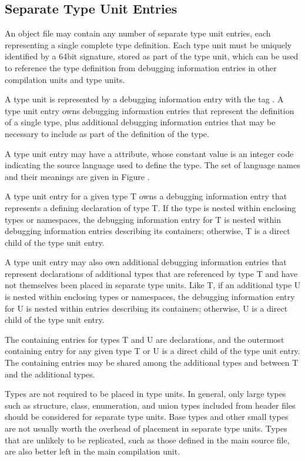 \subsection{Separate Type Unit Entries}
\label{chap:separatetypeunitentries}
An object file may contain any number of separate type
unit entries, each representing a single complete type
definition. Each type unit must be uniquely identified by
a 64\dash bit signature, stored as part of the type unit, which
can be used to reference the type definition from debugging
information entries in other compilation units and type units.

A type unit is represented by a debugging information entry
with the tag . 
A type unit entry owns debugging
information entries that represent the definition of a single
type, plus additional debugging information entries that may
be necessary to include as part of the definition of the type.

A type unit entry may have a  attribute, whose
constant value is an integer code indicating the source
language used to define the type. The set of language names
and their meanings are given in Figure .

A type unit entry for a given type T owns a debugging
information entry that represents a defining declaration
of type T. If the type is nested within enclosing types or
namespaces, the debugging information entry for T is nested
within debugging information entries describing its containers;
otherwise, T is a direct child of the type unit entry.

A type unit entry may also own additional debugging information
entries that represent declarations of additional types that
are referenced by type T and have not themselves been placed in
separate type units. Like T, if an additional type U is nested
within enclosing types or namespaces, the debugging information
entry for U is nested within entries describing its containers;
otherwise, U is a direct child of the type unit entry.

The containing entries for types T and U are declarations,
and the outermost containing entry for any given type T or
U is a direct child of the type unit entry. The containing
entries may be shared among the additional types and between
T and the additional types.

Types are not required to be placed in type units. In general,
only large types such as structure, class, enumeration, and
union types included from header files should be considered
for separate type units. Base types and other small types
are not usually worth the overhead of placement in separate
type units. Types that are unlikely to be replicated, such
as those defined in the main source file, are also better
left in the main compilation unit.

